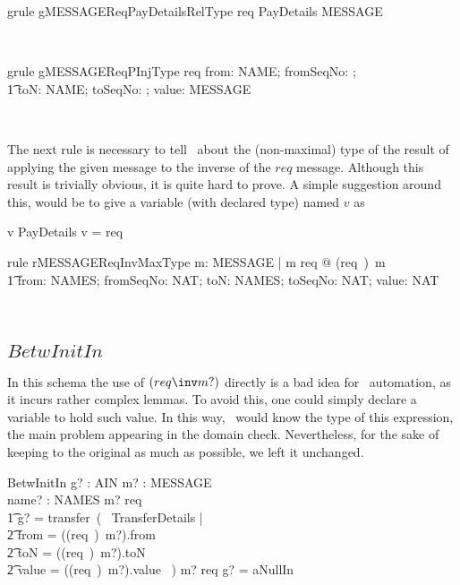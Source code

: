 \begin{LGRT}
\begin{theorem}{grule gMESSAGEReqPayDetailsRelType}
   req \in PayDetails \rel MESSAGE
\end{theorem}~\end{LGRT}

\begin{LGRT}
\begin{theorem}{grule gMESSAGEReqPInjType}
   req \in \lblot from: NAME; fromSeqNo: \nat; \\
        \t1 toN: NAME; toSeqNo: \nat; value: \nat \rblot \pinj MESSAGE
\end{theorem}~\end{LGRT}

The next rule is necessary to tell \zeves\ about the (non-maximal) type of the result of
applying the given message to the inverse of the $req$ message. Although this result is trivially
obvious, it is quite hard to prove. A simple suggestion around this, would be to give a variable
(with declared type) named $v$ as
%
\begin{gzed}
    v \in PayDetails \land v = req\inv
\end{gzed}
%
\begin{LRRT}
\begin{theorem}{rule rMESSAGEReqInvMaxType}
   \forall m: MESSAGE | m \in \ran req @ (req~\inv)~m \in \\ \t1
      \lblot from: NAMES; fromSeqNo: NAT; toN: NAMES; toSeqNo: NAT; value: NAT \rblot
\end{theorem}~\end{LRRT}

\subsection*{$BetwInitIn$}

In this schema the use of $(req\inv m?)$ directly is a bad idea for \zeves\ automation,
as it incurs rather complex lemmas. To avoid this, one could simply declare a variable
to hold such value. In this way, \zeves\ would know the type of this expression, the main
problem appearing in the domain check. Nevertheless, for the sake of keeping to the original
as much as possible, we left it unchanged.
%
\begin{LSDef}
\begin{schema}{BetwInitIn}
  g? : AIN
  \also
  m? : MESSAGE
  \\    name? : NAMES
  \where
  m? \in \ran req \implies
  \\ \t1                g? = transfer~(~ \mu TransferDetails |
  \\ \t2                        from = ((req~\inv)~m?).from
  \\ \t2                        \land toN = ((req~\inv)~m?).toN
  \\ \t2                        \land value = ((req~\inv)~m?).value ~)
  \also
  m? \notin \ran req
  \implies
  g? = aNullIn
\end{schema}~\end{LSDef}

